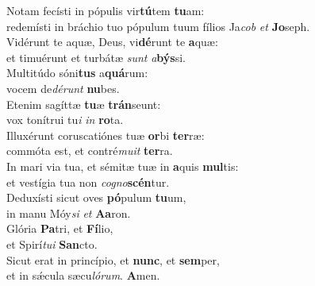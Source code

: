 \evenverse Notam fecísti in pópulis vir\textbf{tú}tem \textbf{tu}am:~\*\\
\evenverse redemísti in bráchio tuo pópulum tuum fílios Ja\textit{cob} \textit{et} \textbf{Jo}seph.\\
\oddverse Vidérunt te aquæ, Deus, vi\textbf{dé}runt te \textbf{a}quæ:~\*\\
\oddverse et timuérunt et turbátæ \textit{sunt} \textit{a}\textbf{býs}si.\\
\evenverse Multitúdo sóni\textbf{tus} a\textbf{quá}rum:~\*\\
\evenverse vocem de\textit{dé}\textit{runt} \textbf{nu}bes.\\
\oddverse Etenim sagíttæ \textbf{tu}æ \textbf{trán}seunt:~\*\\
\oddverse vox tonítrui tu\textit{i} \textit{in} \textbf{ro}ta.\\
\evenverse Illuxérunt coruscatiónes tuæ \textbf{or}bi \textbf{ter}ræ:~\*\\
\evenverse commóta est, et contré\textit{mu}\textit{it} \textbf{ter}ra.\\
\oddverse In mari via tua, et sémitæ tuæ in \textbf{a}quis \textbf{mul}tis:~\*\\
\oddverse et vestígia tua non \textit{co}\textit{gno}\textbf{scén}tur.\\
\evenverse Deduxísti sicut oves \textbf{pó}pulum \textbf{tu}um,~\*\\
\evenverse in manu Móy\textit{si} \textit{et} \textbf{A}\textbf{a}ron.\\
\oddverse Glória \textbf{Pa}tri, et \textbf{Fí}lio,~\*\\
\oddverse et Spirí\textit{tu}\textit{i} \textbf{San}cto.\\
\evenverse Sicut erat in princípio, et \textbf{nunc}, et \textbf{sem}per,~\*\\
\evenverse et in sǽcula sæcu\textit{ló}\textit{rum}. \textbf{A}men.\\
